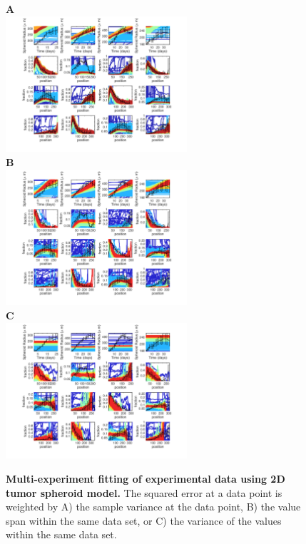 \documentclass[10pt,letterpaper]{article}
\begin{document}
\begin{figure}[p]
\begin{adjustwidth}{-2in}{0in} %
\begin{center}
\textbf{A}\\
\includegraphics[width=0.6\textwidth]{Data/Tumor2dfull_trunc_fixerr_P100__NEW_fits}\\
\textbf{B}\\
\includegraphics[width=0.6\textwidth]{Data/Tumor2dfull_trunc_fixerr_minmax_P100__NEW_fits}\\
\textbf{C}\\
\includegraphics[width=0.6\textwidth]{Data/Tumor2dfull_trunc_fixerr_std_P100__NEW_fits}
\end{center}
\vspace*{0.5cm}
\caption{{\bf Multi-experiment fitting of experimental data using 2D tumor spheroid model.}
The squared error at a data point is weighted by A) the sample variance at the data point, B) the value span within the same data set, or C) the variance of the values within the same data set. 
}
\label{fig: multi-experiment fitting using 2D model}
\end{adjustwidth}
\end{figure}
\end{document}
